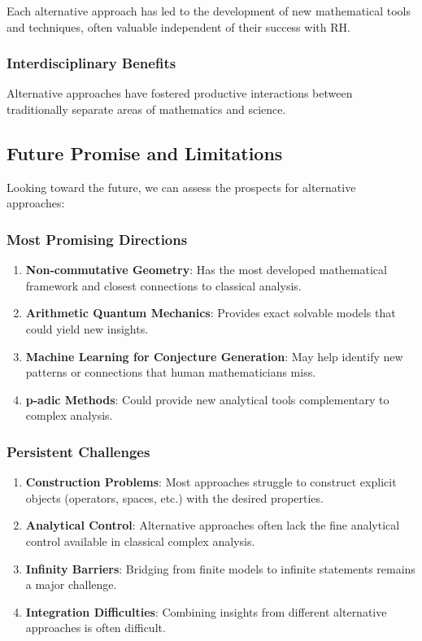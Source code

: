 Each alternative approach has led to the development of new mathematical tools and techniques, often valuable independent of their success with RH.

\subsubsection{Interdisciplinary Benefits}

Alternative approaches have fostered productive interactions between traditionally separate areas of mathematics and science.

\subsection{Future Promise and Limitations}

Looking toward the future, we can assess the prospects for alternative approaches:

\subsubsection{Most Promising Directions}

\begin{enumerate}
\item \textbf{Non-commutative Geometry}: Has the most developed mathematical framework and closest connections to classical analysis.

\item \textbf{Arithmetic Quantum Mechanics}: Provides exact solvable models that could yield new insights.

\item \textbf{Machine Learning for Conjecture Generation}: May help identify new patterns or connections that human mathematicians miss.

\item \textbf{p-adic Methods}: Could provide new analytical tools complementary to complex analysis.
\end{enumerate}

\subsubsection{Persistent Challenges}

\begin{enumerate}
\item \textbf{Construction Problems}: Most approaches struggle to construct explicit objects (operators, spaces, etc.) with the desired properties.

\item \textbf{Analytical Control}: Alternative approaches often lack the fine analytical control available in classical complex analysis.

\item \textbf{Infinity Barriers}: Bridging from finite models to infinite statements remains a major challenge.

\item \textbf{Integration Difficulties}: Combining insights from different alternative approaches is often difficult.
\end{enumerate}

